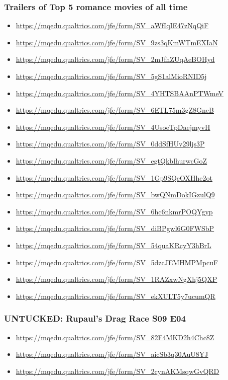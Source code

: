\documentclass{article}
\newenvironment{subs}
  {\adjustwidth{3em}{0pt}}
  {\endadjustwidth}
\begin{document}
\begin{subappendices}
\begin{subs}
        \subsubsection*{Trailers of Top 5 romance movies of all time}
        \begin{itemize}
            \item \url{https://mqedu.qualtrics.com/jfe/form/SV_aWfIqIE47zNqQiF}
            \item \url{https://mqedu.qualtrics.com/jfe/form/SV_9zs3qKmWTmEXIaN}
            \item \url{https://mqedu.qualtrics.com/jfe/form/SV_2mJfhZUqAeBOHyd}
            \item \url{https://mqedu.qualtrics.com/jfe/form/SV_5gS1alMioRNID5j}
            \item \url{https://mqedu.qualtrics.com/jfe/form/SV_4YHTSBAAnPTWmeV}
            \item \url{https://mqedu.qualtrics.com/jfe/form/SV_6ETL75m3gZ8GneB}
            \item \url{https://mqedu.qualtrics.com/jfe/form/SV_4UsoeTpDaejmyvH}
            \item \url{https://mqedu.qualtrics.com/jfe/form/SV_0ddSfHUv29ljs3P}
            \item \url{https://mqedu.qualtrics.com/jfe/form/SV_egtQkblhurwcGoZ}
            \item \url{https://mqedu.qualtrics.com/jfe/form/SV_1Gp9SQeOXHhe2ot}
            \item \url{https://mqedu.qualtrics.com/jfe/form/SV_bwQNmDokIGzulQ9}
            \item \url{https://mqedu.qualtrics.com/jfe/form/SV_6hc6nkmrPOQYgyp}
            \item \url{https://mqedu.qualtrics.com/jfe/form/SV_diBPgwl6G0FWSbP}
            \item \url{https://mqedu.qualtrics.com/jfe/form/SV_54quaKRcyY3hBrL}
            \item \url{https://mqedu.qualtrics.com/jfe/form/SV_5dzcJEMHMPMpcuF}
            \item \url{https://mqedu.qualtrics.com/jfe/form/SV_1RAZxwNgXhj5QXP}
            \item \url{https://mqedu.qualtrics.com/jfe/form/SV_ekXULT5y7ucumQR}
        \end{itemize}
        
        \subsubsection*{UNTUCKED: Rupaul's Drag Race S09 E04}
        \begin{itemize}
            \item \url{https://mqedu.qualtrics.com/jfe/form/SV_82F4MKD2h4Chc8Z}
            \item \url{https://mqedu.qualtrics.com/jfe/form/SV_aicSb3q30AuU8YJ}
            \item \url{https://mqedu.qualtrics.com/jfe/form/SV_2cynAKMsqwGvQRD}
        \end{itemize}
    \end{subs}
\end{subappendices}
\end{document}
